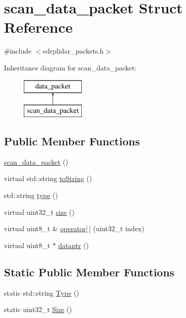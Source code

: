 \hypertarget{structscan__data__packet}{\section{scan\-\_\-data\-\_\-packet Struct Reference}
\label{structscan__data__packet}
}


{\ttfamily \#include $<$edrplidar\-\_\-packets.\-h$>$}

Inheritance diagram for scan\-\_\-data\-\_\-packet\-:\begin{figure}[H]
\begin{center}
\leavevmode
\includegraphics[height=2.000000cm]{structscan__data__packet}
\end{center}
\end{figure}
\subsection*{Public Member Functions}
\begin{DoxyCompactItemize}
\item 
\hyperlink{structscan__data__packet_a991911b1c806c6b288baa4b7b95d8e1d}{scan\-\_\-data\-\_\-packet} ()
\item 
virtual std\-::string \hyperlink{structscan__data__packet_aa8d4b795a798f413149c93760de6577f}{to\-String} ()
\item 
std\-::string \hyperlink{structscan__data__packet_a8401263b8927ca5a67ca23c8797cc67e}{type} ()
\item 
virtual uint32\-\_\-t \hyperlink{structscan__data__packet_a2678e9313e25c529abba1c1ba5ff3cba}{size} ()
\item 
virtual uint8\-\_\-t \& \hyperlink{structscan__data__packet_ac8b9b314239dd2663a7d2b98e5cd1c1a}{operator\mbox{[}$\,$\mbox{]}} (uint32\-\_\-t index)
\item 
virtual uint8\-\_\-t $\ast$ \hyperlink{structscan__data__packet_a376edae10eddfa50b3684e801a0a8f3a}{dataptr} ()
\end{DoxyCompactItemize}
\subsection*{Static Public Member Functions}
\begin{DoxyCompactItemize}
\item 
static std\-::string \hyperlink{structscan__data__packet_add0b207133c083ddbea5a2d7c094baba}{Type} ()
\item 
static uint32\-\_\-t \hyperlink{structscan__data__packet_a383d91432a45ada918769e2737b9593e}{Size} ()
\end{DoxyCompactItemize}

